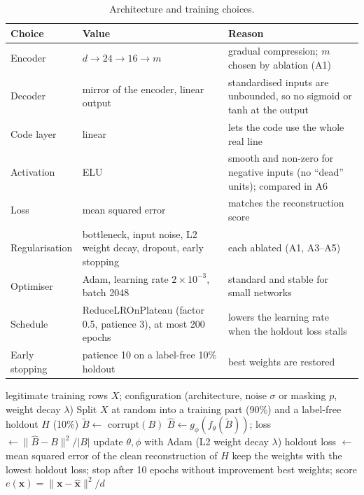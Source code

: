 \documentclass[12pt]{article}
\begin{document}
\begin{table}[H]
\centering\small
\caption{Architecture and training choices.}
\label{tab:arch}
\begin{tabularx}{\linewidth}{@{}l >{\raggedright\arraybackslash}X >{\raggedright\arraybackslash}X@{}}
\toprule
\textbf{Choice} & \textbf{Value} & \textbf{Reason}\\
\midrule
Encoder & $d\rightarrow24\rightarrow16\rightarrow m$ & gradual compression; $m$ chosen by ablation (A1)\\
Decoder & mirror of the encoder, linear output & standardised inputs are unbounded, so no sigmoid or tanh at the output\\
Code layer & linear & lets the code use the whole real line\\
Activation & ELU & smooth and non-zero for negative inputs (no ``dead'' units); compared in A6\\
Loss & mean squared error & matches the reconstruction score\\
Regularisation & bottleneck, input noise, L2 weight decay, dropout, early stopping & each ablated (A1, A3--A5)\\
Optimiser & Adam, learning rate $2\times10^{-3}$, batch 2048 & standard and stable for small networks\\
Schedule & ReduceLROnPlateau (factor 0.5, patience 3), at most 200 epochs & lowers the learning rate when the holdout loss stalls\\
Early stopping & patience 10 on a label-free 10\% holdout & best weights are restored\\
\bottomrule
\end{tabularx}
\end{table}

\begin{algorithm}[H]
\caption{Training an autoencoder on legitimate transactions}
\label{alg:train}
\begin{algorithmic}[1]
\Require legitimate training rows $X$; configuration (architecture, noise $\sigma$ or masking $p$, weight decay $\lambda$)
\State Split $X$ at random into a training part (90\%) and a label-free holdout $H$ (10\%)
    \State $\tilde B\gets$ corrupt$(B)$ 
    \State $\hat B\gets g_\phi(f_\theta(\tilde B))$;\; loss $\gets\lVert \hat B-B\rVert^2/|B|$
    \State update $\theta,\phi$ with Adam (L2 weight decay $\lambda$)
  \EndFor
  \State holdout loss $\gets$ mean squared error of the clean reconstruction of $H$
  \State keep the weights with the lowest holdout loss; stop after 10 epochs without improvement
\EndFor
\State \Return best weights; score $e(\mathbf{x})=\lVert\mathbf{x}-\hat{\mathbf{x}}\rVert^2/d$
\end{algorithmic}
\end{algorithm}
\end{document}

